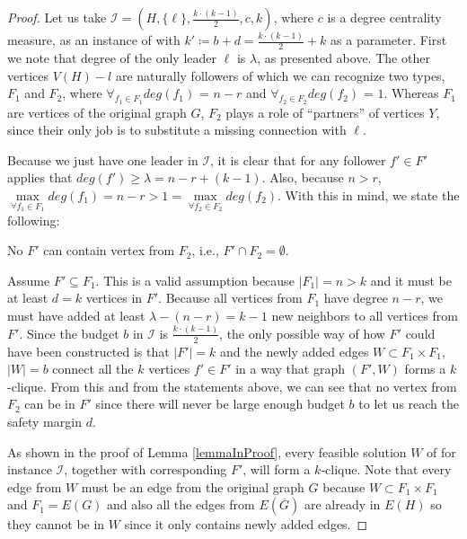 \begin{proof}
    Let us take $ \mathcal{I} = (H, \{\ell\}, \frac{k\cdot(k-1)}{2}, c, k)$, where $c$ is a degree centrality measure,
    as an instance of \HLdeg with $k' \coloneqq b + d = \frac{k\cdot(k-1)}{2} + k$ as a parameter.
    First we note that degree of the only leader $\ell$ is $\lambda$, as presented above.
    The other vertices $V(H) - l$ are naturally followers of which we can recognize two types, $F_1$ and $F_2$,
    where $\forall_{f_1 \in F_1} deg(f_1)$ = $n-r$ and $\forall_{f_2 \in F_2} deg(f_2)$ = $1$.
    Whereas $F_1$ are vertices of the original graph $G$,
    $F_2$ plays a role of ``partners'' of vertices $Y$, since their only job is to substitute a missing connection with $\ell$.

    Because we just have one leader in $\mathcal{I}$, it is clear that for any follower $f' \in F'$ applies that
    $deg(f') \geq \lambda = n - r + (k - 1)$.
    Also, because $n > r$, $\max\limits_{\forall f_1 \in F_1}deg(f_1) = n-r > 1 = \max\limits_{\forall f_2 \in F_2}deg(f_2)$.
    With this in mind, we state the following:

    \begin{lemma}\label{lemmaInProof}
        No $F'$ can contain vertex from $F_2$, i.e., $F' \cap F_2 = \emptyset$.
    \end{lemma}
    \begin{subproof}
        Assume $F' \subseteq F_1$. This is a valid assumption because $|F_1| = n > k$ and it must be at least $d = k$ vertices in $F'$.
        Because all vertices from $F_1$ have degree $n-r$, we must have added at least $\lambda - (n - r) = k - 1$ new neighbors to all vertices from $F'$.
        Since the budget $b$ in $\mathcal{I}$ is $\frac{k\cdot(k-1)}{2}$,
        the only possible way of how $F'$ could have been constructed is that $|F'|=k$ and the newly added edges $W \subset F_1 \times F_1$, $|W| = b$
        connect all the $k$ vertices $f' \in F'$ in a way that graph $(F', W)$ forms a $k$-clique.
        From this and from the statements above, we can see that no vertex from $F_2$ can be in $F'$
        since there will never be large enough budget $b$ to let us reach the safety margin $d$.
    \end{subproof}

    As shown in the proof of Lemma \ref{lemmaInProof}, every feasible solution $W$ of \HLshort for instance $\mathcal{I}$, together with corresponding $F'$,
    will form a $k$-clique.
    Note that every edge from $W$ must be an edge from the original graph $G$ because $W \subset F_1 \times F_1$ and $F_1 = E(G)$
    and also all the edges from $E(\overline{G})$ are already in $E(H)$ so they cannot be in $W$ since it only contains newly added edges.


\end{proof}
